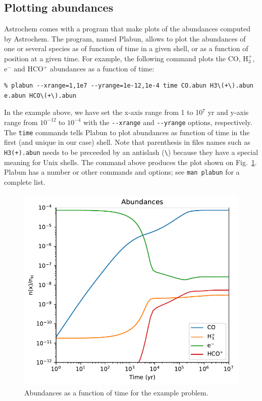 \documentclass[a4paper,12pt]{article}
\begin{document}
\subsection{Plotting abundances}
\label{sec:plotting-abundances}

Astrochem comes with a program that make plots of the abundances
computed by Astrochem. The program, named Plabun, allows to plot the
abundances of one or several species as of function of time in a given
shell, or as a function of position at a given time. For example, the
following command plots the CO, H$_{3}^{+}$, e$^{-}$ and HCO$^{+}$
abundances as a function of time:

\begin{verbatim}
% plabun --xrange=1,1e7 --yrange=1e-12,1e-4 time CO.abun H3\(+\).abun
e.abun HCO\(+\).abun
\end{verbatim}

In the example above, we have set the x-axis range from 1 to 10$^{7}$
yr and y-axis range from $10^{-12}$ to $10^{-4}$ with the
\verb=--xrange= and \verb=--yrange= options, respectively. The
\verb=time= commands tells Plabun to plot abundances as function of
time in the first (and unique in our case) shell. Note that
parenthesis in files names such as \verb=H3(+).abun= needs to be
preceeded by an antislash (\verb=\=) because they have a special
meaning for Unix shells. The command above produces the plot shown on
Fig.~\ref{fig:example-abundances}. Plabun has a number or other
commands and options; see \verb=man plabun= for a complete list.

\begin{figure}
  \begin{center}
    \includegraphics[height=10cm]{fig1.pdf}
  \end{center}
  \caption{Abundances as a function of time for the example problem.}
  \label{fig:example-abundances}
\end{figure}
\end{document}
